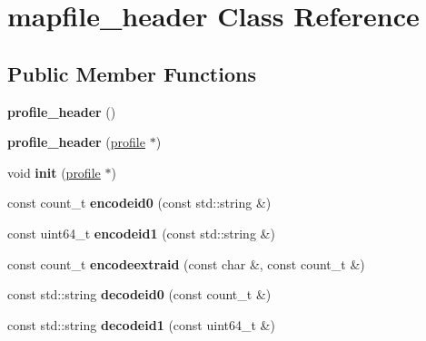 \hypertarget{classmapfile__header}{\section{mapfile\-\_\-header Class Reference}
\label{classmapfile__header}
}
\subsection*{Public Member Functions}
\begin{DoxyCompactItemize}
\item 
\hypertarget{classmapfile__header_ac800fdc30f729de752a14658e171cf62}{{\bfseries profile\-\_\-header} ()}\label{classmapfile__header_ac800fdc30f729de752a14658e171cf62}

\item 
\hypertarget{classmapfile__header_a5d8d9e9ccaa484f1c5ccb7789d64db8c}{{\bfseries profile\-\_\-header} (\hyperlink{classprofile}{profile} $\ast$)}\label{classmapfile__header_a5d8d9e9ccaa484f1c5ccb7789d64db8c}

\item 
\hypertarget{classmapfile__header_a8a1c46707993780c9e5eaf104be65bbe}{void {\bfseries init} (\hyperlink{classprofile}{profile} $\ast$)}\label{classmapfile__header_a8a1c46707993780c9e5eaf104be65bbe}

\item 
\hypertarget{classmapfile__header_a2ffc9fd27ea69eaccc678d614e1e6d68}{const count\-\_\-t {\bfseries encodeid0} (const std\-::string \&)}\label{classmapfile__header_a2ffc9fd27ea69eaccc678d614e1e6d68}

\item 
\hypertarget{classmapfile__header_ada3852f0ac855a3a214081ff63b81745}{const uint64\-\_\-t {\bfseries encodeid1} (const std\-::string \&)}\label{classmapfile__header_ada3852f0ac855a3a214081ff63b81745}

\item 
\hypertarget{classmapfile__header_a18669ea2f58c61870e1864fc9ebef037}{const count\-\_\-t {\bfseries encodeextraid} (const char \&, const count\-\_\-t \&)}\label{classmapfile__header_a18669ea2f58c61870e1864fc9ebef037}

\item 
\hypertarget{classmapfile__header_aa4d920c4dfbc355406f5d4fb37844024}{const std\-::string {\bfseries decodeid0} (const count\-\_\-t \&)}\label{classmapfile__header_aa4d920c4dfbc355406f5d4fb37844024}

\item 
\hypertarget{classmapfile__header_a9c005b69f680dac6702d44016d676187}{const std\-::string {\bfseries decodeid1} (const uint64\-\_\-t \&)}\label{classmapfile__header_a9c005b69f680dac6702d44016d676187}


\end{DoxyCompactItemize}
